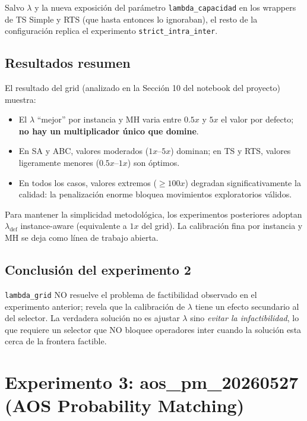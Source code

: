 Salvo $\lambda$ y la nueva exposición del parámetro
\texttt{lambda\_capacidad} en los wrappers de TS Simple y RTS (que
hasta entonces lo ignoraban), el resto de la configuración replica el
experimento \texttt{strict\_intra\_inter}.

\subsection{Resultados resumen}

El resultado del grid (analizado en la Sección 10 del notebook del
proyecto) muestra:

\begin{itemize}
\item El $\lambda$ ``mejor'' por instancia y MH varia entre $0.5x$ y
  $5x$ el valor por defecto; \textbf{no hay un multiplicador único que
  domine}.
\item En SA y ABC, valores moderados ($1x$--$5x$) dominan; en TS y RTS,
  valores ligeramente menores ($0.5x$--$1x$) son óptimos.
\item En todos los casos, valores extremos ($\ge 100x$) degradan
  significativamente la calidad: la penalización enorme bloquea
  movimientos exploratorios válidos.
\end{itemize}

Para mantener la simplicidad metodológica, los experimentos
posteriores adoptan $\lambda_{\text{def}}$ instance-aware
(equivalente a $1x$ del grid). La calibración fina por instancia y MH
se deja como línea de trabajo abierta.

\subsection{Conclusión del experimento 2}

\texttt{lambda\_grid} NO resuelve el problema de factibilidad observado
en el experimento anterior; revela que la calibración de $\lambda$
tiene un efecto secundario al del selector. La verdadera solución no
es ajustar $\lambda$ sino \emph{evitar la infactibilidad}, lo que
requiere un selector que NO bloquee operadores inter cuando la solución
esta cerca de la frontera factible.

\section{Experimento 3: aos\_pm\_20260527 (AOS Probability Matching)}
\label{sec:exp-aos}

